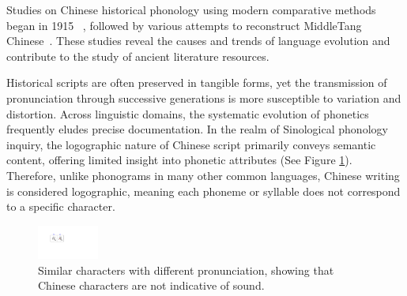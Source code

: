     Studies on Chinese historical phonology using modern comparative methods began in 1915 ~\cite{karlgren_etudes_1915}, followed by various attempts to reconstruct MiddleTang Chinese~\cite{TheReconstructionofAncientChinese,Pulleyblank_1991,wang_l_hanyu_2012}.
    These studies reveal the causes and trends of language evolution and contribute to the study of ancient literature resources.
     
     Historical scripts are often preserved in tangible forms, yet the transmission of pronunciation through successive generations is more susceptible to variation and distortion. Across linguistic domains, the systematic evolution of phonetics frequently eludes precise documentation. In the realm of Sinological phonology inquiry, the logographic nature of Chinese script primarily conveys semantic content, offering limited insight into phonetic attributes (See Figure \ref{fig:different_pronunciation}).
      Therefore, unlike phonograms in many other common languages, Chinese writing is considered logographic, meaning each phoneme or syllable does not correspond to a specific character.
    \begin{figure}[ht]
        \centering
        \includegraphics[width=2cm]{images/diff_pro.pdf}
        \caption{Similar characters with different pronunciation, showing that Chinese characters are not indicative of
        sound.} \label{fig:different_pronunciation}
    \end{figure}
     
